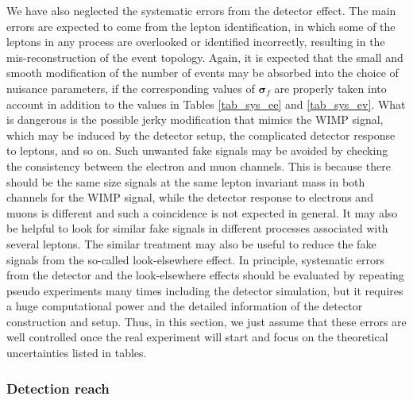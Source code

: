 \documentclass[12pt,twoside,book]{article}
\begin{document}
We have also neglected the systematic errors from the detector effect.
The main errors are expected to come from the lepton identification, in which some of the leptons in any process are overlooked or identified incorrectly, resulting in the mis-reconstruction of the event topology.
Again, it is expected that the small and smooth modification of the number of events may be absorbed into the choice of nuisance parameters, if the corresponding values of $\bm{\sigma}_f$ are properly taken into account in addition to the values in Tables
\ref{tab_sys_ee} and \ref{tab_sys_ev}.
What is dangerous is the possible jerky modification that mimics the WIMP signal, which may be induced by the detector setup, the complicated detector response to leptons, and so on.
Such unwanted fake signals may be avoided by checking the consistency between the electron and muon channels.
This is because there should be the same size signals at the same lepton invariant mass in both channels for the WIMP signal, while the detector response to electrons and muons is different and such a coincidence is not expected in general.
It may also be helpful to look for similar fake signals in different processes associated with several leptons.
The similar treatment may also be useful to reduce the fake signals from the so-called look-elsewhere effect.
In principle, systematic errors from the detector and the look-elsewhere effects should be evaluated by repeating pseudo experiments many times including the detector simulation, but it requires a huge computational power and the detailed information of the detector construction and setup.
Thus, in this section, we just assume that these errors are well controlled once the real experiment will start and focus on the theoretical uncertainties listed in tables.


\subsubsection{Detection reach}
\label{sec_detection}
\end{document}

